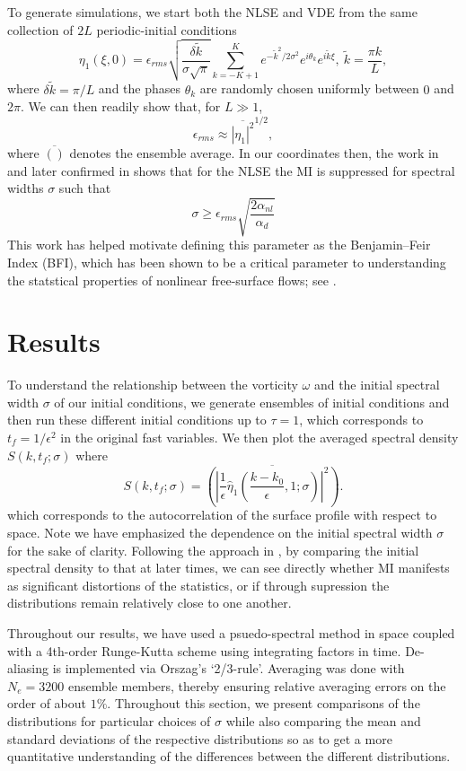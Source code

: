 \documentclass[a4paper,11pt]{article}
\begin{document}
To generate simulations, we start both the NLSE and VDE from the same collection of $2L$ periodic-initial conditions
\[
\eta_{1}(\xi,0) = \epsilon_{rms}\sqrt{\frac{\delta \tilde{k}}{\sigma\sqrt{\pi}}} \sum_{k=-K+1}^{K}e^{-\tilde{k}^{2}/2\sigma^{2}}e^{i\theta_{k}}e^{i\tilde{k}\xi}, ~ \tilde{k} = \frac{\pi k}{L},
\]
where $\delta \tilde{k}=\pi/L$ and the phases $\theta_{k}$ are randomly chosen uniformly between $0$ and $2\pi$.  We can then readily show that, for $L\gg 1$, 
\[
\epsilon_{rms} \approx \overline{\left|\eta_{1}\right|^{2}}^{1/2},
\]
where $\overline{()}$ denotes the ensemble average.  In our coordinates then, the work in \cite{alber} and later confirmed in \cite{dysthe2} shows that for the NLSE the MI is suppressed for spectral widths $\sigma$ such that 
\[
\sigma \geq \epsilon_{rms}\sqrt{\frac{2\alpha_{nl}}{\alpha_{d}}}
\]
This work has helped motivate defining this parameter as the Benjamin--Feir Index (BFI), which has been shown to be a critical parameter to understanding the statstical properties of nonlinear free-surface flows; see \cite{onorato, thomas2012nonlinear}.
\section*{Results}
To understand the relationship between the vorticity $\omega$ and the initial spectral width $\sigma$ of our initial conditions, we generate ensembles of initial conditions and then run these different initial conditions up to $\tau=1$, which corresponds to $t_{f} = 1/\epsilon^{2}$ in the original fast variables.  We then plot the averaged spectral density $S(k,t_{f};\sigma)$ where 
\[
S\left(k,t_{f};\sigma\right) = \overline{\left( \left|\frac{1}{\epsilon}\hat{\eta}_{1}\left(\frac{k-k_{0}}{\epsilon},1;\sigma \right)\right|^{2}\right)}.
\]
which corresponds to the autocorrelation of the surface profile with respect to space.  Note we have emphasized the dependence on the initial spectral width $\sigma$ for the sake of clarity.  Following the approach in \cite{dysthe2,dysthe3}, by comparing the initial spectral density to that at later times, we can see directly whether MI manifests as significant distortions of the statistics, or if through supression the distributions remain relatively close to one another.  

Throughout our results, we have used a psuedo-spectral method in space coupled with a 4th-order Runge-Kutta scheme using integrating factors in time.  De-aliasing is implemented via Orszag's `2/3-rule'.  Averaging was done with $N_{e}=3200$ ensemble members, thereby ensuring relative averaging errors on the order of about $1\%$.  Throughout this section, we present comparisons of the distributions for particular choices of $\sigma$ while also comparing the mean and standard deviations of the respective distributions so as to get a more quantitative understanding of the differences between the different distributions.  
\end{document}

